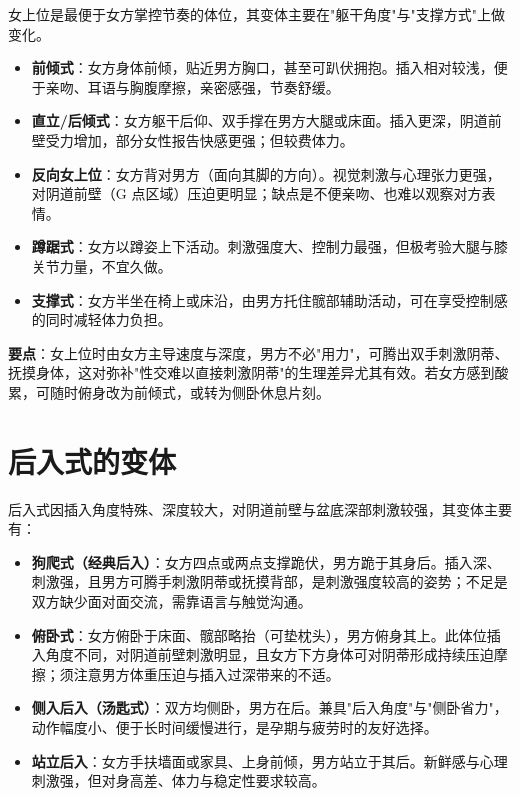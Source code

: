 \documentclass[12pt,UTF8]{ctexbook}
\begin{document}
女上位是最便于女方掌控节奏的体位，其变体主要在"躯干角度"与"支撑方式"上做变化。

\begin{itemize}
	\item \textbf{前倾式}：女方身体前倾，贴近男方胸口，甚至可趴伏拥抱。插入相对较浅，便于亲吻、耳语与胸腹摩擦，亲密感强，节奏舒缓。
	\item \textbf{直立/后倾式}：女方躯干后仰、双手撑在男方大腿或床面。插入更深，阴道前壁受力增加，部分女性报告快感更强；但较费体力。
	\item \textbf{反向女上位}：女方背对男方（面向其脚的方向）。视觉刺激与心理张力更强，对阴道前壁（G 点区域）压迫更明显；缺点是不便亲吻、也难以观察对方表情。
	\item \textbf{蹲踞式}：女方以蹲姿上下活动。刺激强度大、控制力最强，但极考验大腿与膝关节力量，不宜久做。
	\item \textbf{支撑式}：女方半坐在椅上或床沿，由男方托住髋部辅助活动，可在享受控制感的同时减轻体力负担。
\end{itemize}

\noindent\textbf{要点}：女上位时由女方主导速度与深度，男方不必"用力"，可腾出双手刺激阴蒂、抚摸身体，这对弥补"性交难以直接刺激阴蒂"的生理差异尤其有效。若女方感到酸累，可随时俯身改为前倾式，或转为侧卧休息片刻。

\vspace{0.5em}
\section{后入式的变体}

后入式因插入角度特殊、深度较大，对阴道前壁与盆底深部刺激较强，其变体主要有：

\begin{itemize}
	\item \textbf{狗爬式（经典后入）}：女方四点或两点支撑跪伏，男方跪于其身后。插入深、刺激强，且男方可腾手刺激阴蒂或抚摸背部，是刺激强度较高的姿势；不足是双方缺少面对面交流，需靠语言与触觉沟通。
	\item \textbf{俯卧式}：女方俯卧于床面、髋部略抬（可垫枕头），男方俯身其上。此体位插入角度不同，对阴道前壁刺激明显，且女方下方身体可对阴蒂形成持续压迫摩擦；须注意男方体重压迫与插入过深带来的不适。
	\item \textbf{侧入后入（汤匙式）}：双方均侧卧，男方在后。兼具"后入角度"与"侧卧省力"，动作幅度小、便于长时间缓慢进行，是孕期与疲劳时的友好选择。
	\item \textbf{站立后入}：女方手扶墙面或家具、上身前倾，男方站立于其后。新鲜感与心理刺激强，但对身高差、体力与稳定性要求较高。
\end{itemize}
\end{document}
